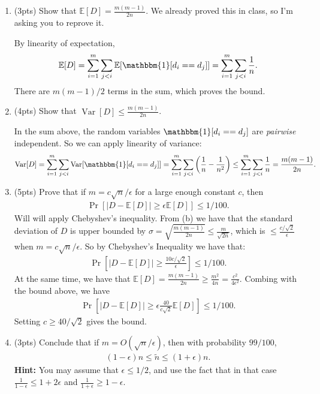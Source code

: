 \documentclass[10pt]{article}
\newcommand{\E}{\mathbb{E}}
\DeclareMathOperator{\Var}{Var}
\begin{document}
\begin{enumerate}[label=(\alph*)]
	\item (3pts) Show that $\E[D] = \frac{m(m-1)}{2n}$. We already proved this in class, so I'm asking you to reprove it. 
	
By linearity of expectation,	
\begin{align*}
	\E[D] = \sum_{i=1}^m \sum_{j < i}\E[\mathbbm{1}[d_i == d_j]] = \sum_{i=1}^m \sum_{j < i} \frac{1}{n}.
\end{align*}
There are $m(m-1)/2$ terms in the sum, which proves the bound.

	\item (4pts) Show that $\Var[D] \leq \frac{m(m-1)}{2n}$. 
	
	In the sum above, the random variables $\mathbbm{1}[d_i == d_j]$ are \emph{pairwise} independent. So we can apply linearity of variance:
	\begin{align*}
		\Var[D] = \sum_{i=1}^m \sum_{j < i}\Var[\mathbbm{1}[d_i == d_j]] = \sum_{i=1}^m \sum_{j < i} \left(\frac{1}{n} - \frac{1}{n^2}\right) \leq  \sum_{i=1}^m \sum_{j < i} \frac{1}{n} =  \frac{m(m-1)}{2n}.
	\end{align*}
	
	\item (5pts) Prove that if $m = c\sqrt{n}/\epsilon$ for a large enough constant $c$, then
	\begin{align*}
		\Pr[|D - \E[D]| \geq \epsilon\E[D]] \leq 1/100.
	\end{align*}
	Will will apply Chebyshev's inequality. From (b) we have that the standard deviation of $D$ is upper bounded by $\sigma = \sqrt{ \frac{m(m-1)}{2n}} \leq \frac{m}{\sqrt{2n}}$, which is $\leq \frac{c/\sqrt{2}}{\epsilon}$ when $m = c\sqrt{n}/\epsilon$. So by Chebyshev's Inequality we have that:
	\begin{align*}
		\Pr[|D - \E[D]| \geq \frac{10c/\sqrt{2}}{\epsilon}] \leq 1/100.
	\end{align*}
	At the same time, we have that $\E[D] = \frac{m(m-1)}{2n} \geq \frac{m^2}{4n} = \frac{c^2}{4\epsilon^2}$.  Combing with the bound above, we have
	\begin{align*}
		\Pr[|D - \E[D]| \geq \epsilon \frac{40}{c\sqrt{2}}\E[D]] \leq 1/100.
	\end{align*}
Setting $c \geq 40/\sqrt{2}$ gives the bound.
	
	\item (3pts) Conclude that if $m = O(\sqrt{n}/\epsilon)$, then with probability $99/100$, 
	\begin{align*}
		(1-\epsilon)n \leq \tilde{n} \leq (1+\epsilon)n.
	\end{align*}
	\textbf{Hint:} You may assume that $\epsilon \leq 1/2$, and use the fact that in that case $\frac{1}{1-\epsilon} \leq 1 + 2\epsilon$ and $\frac{1}{1+\epsilon} \geq 1-\epsilon$.
	

\end{enumerate}
\end{document}
